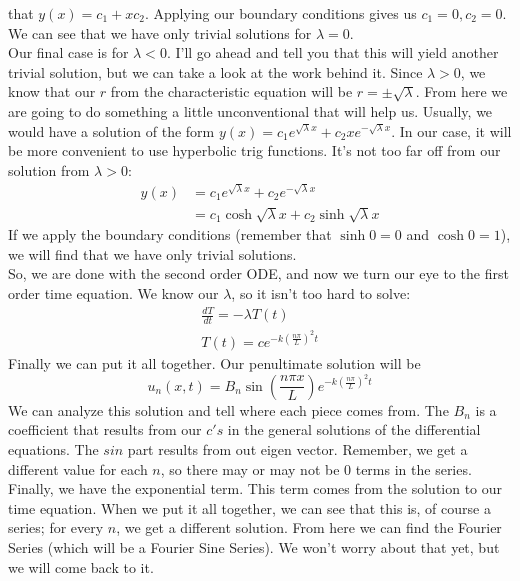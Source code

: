 \documentclass{article}
\begin{document}
that $y(x) = c_{1} + xc_{2}$. Applying our boundary conditions gives us
$c_{1} = 0, c_{2} = 0$. We can see that we have only trivial solutions for
$\lambda = 0$.\\
\indent Our final case is for $\lambda < 0$. I'll go ahead and tell you that
this will yield another trivial solution, but we can take a look at the work
behind it. Since $\lambda > 0$, we know that our $r$ from the characteristic
equation will be $r = \pm \sqrt{\lambda}$. From here we are going to do something
 a little unconventional that will help us. Usually, we would have a solution of
the form $y(x) = c_{1}e^{\sqrt{\lambda}x} + c_{2}x e^{-\sqrt{\lambda}x}$. In our
case, it will be more convenient to use hyperbolic trig functions. It's not too
far off from our solution from $\lambda > 0$:
\begin{align*}
y(x) &= c_{1}e^{\sqrt{\lambda}x} + c_{2}e^{-\sqrt{\lambda}x}\\
&= c_{1}\cosh{\sqrt{\lambda}x} + c_{2}\sinh{\sqrt{\lambda}x}
\end{align*}
\noindent If we apply the boundary conditions (remember that
$\sinh{0} = 0$ and $\cosh{0} = 1$), we will find that we have only trivial
solutions.\\
\indent So, we are done with the second order ODE, and now we turn our eye to
the first order time equation. We know our $\lambda$, so it isn't too hard to solve:
\begin{gather*}
\frac{dT}{dt} = -\lambda T(t)\\
T(t) = ce^{-k\left(\frac{n\pi}{L}\right)^{2}t}
\end{gather*}
\indent Finally we can put it all together. Our penultimate solution will be
\[
u_{n}(x,t) = B_{n}\sin{\left(\frac{n\pi x}{L}\right)}e^{-k\left(\frac{n\pi}{L}\right)^{2}t}
\]
\noindent We can analyze this solution and tell where each piece comes from.
The $B_{n}$ is a coefficient that results from our $c's$ in the general solutions
of the differential equations. The $sin$ part results from out eigen vector.
Remember, we get a different value for each $n$, so there may or may not be $0$
terms in the series. Finally, we have the exponential term. This term comes from
the solution to our time equation. When we put it all together, we can see that
this is, of course a series; for every $n$, we get a different solution. From
here we can find the Fourier Series (which will be a Fourier Sine Series). We
won't worry about that yet, but we will come back to it.
\newpage
\end{document}
